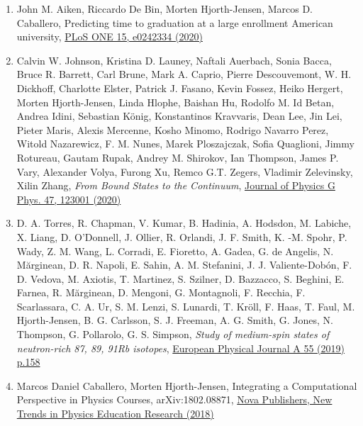 \documentclass[%
oneside,                 %
final,                   %
10pt]{article}
\begin{document}
\begin{enumerate}
\item John M. Aiken, Riccardo De Bin, Morten Hjorth-Jensen, Marcos D. Caballero, Predicting time to graduation at a large enrollment American university, \href{{https://doi.org/10.1371/journal.pone.0242334}}{PLoS ONE 15, e0242334 (2020)}

\item Calvin W. Johnson, Kristina D. Launey, Naftali Auerbach, Sonia Bacca, Bruce R. Barrett, Carl Brune, Mark A. Caprio, Pierre Descouvemont, W. H. Dickhoff, Charlotte Elster, Patrick J. Fasano, Kevin Fossez, Heiko Hergert, Morten Hjorth-Jensen, Linda Hlophe, Baishan Hu, Rodolfo M. Id Betan, Andrea Idini, Sebastian König, Konstantinos Kravvaris, Dean Lee, Jin Lei, Pieter Maris, Alexis Mercenne, Kosho Minomo, Rodrigo Navarro Perez, Witold Nazarewicz, F. M. Nunes, Marek Ploszajczak, Sofia Quaglioni, Jimmy Rotureau, Gautam Rupak, Andrey M. Shirokov, Ian Thompson, James P. Vary, Alexander Volya, Furong Xu, Remco G.T. Zegers, Vladimir Zelevinsky, Xilin Zhang, \emph{From Bound States to the Continuum}, \href{{https://urldefense.com/v3/__https://iopscience.iop.org/article/10.1088/1361-6471/abb129__;!!HXCxUKc!nOuho6Yd_SYxj9PUxWEODhuHbyyRAD_27R1bipWQvrj6Jjnwzdi7Z4FRJSF1-w$}}{Journal of Physics G Phys. 47, 123001  (2020)}

\item D. A. Torres, R. Chapman, V. Kumar, B. Hadinia, A. Hodsdon, M. Labiche, X. Liang, D. O’Donnell, J. Ollier, R. Orlandi, J. F. Smith, K. -M. Spohr, P. Wady, Z. M. Wang, L. Corradi, E. Fioretto, A. Gadea, G. de Angelis, N. Mărginean, D. R. Napoli, E. Sahin, A. M. Stefanini, J. J. Valiente-Dobón, F. D. Vedova, M. Axiotis, T. Martinez, S. Szilner, D. Bazzacco, S. Beghini, E. Farnea, R. Mărginean, D. Mengoni, G. Montagnoli, F. Recchia, F. Scarlassara, C. A. Ur, S. M. Lenzi, S. Lunardi, T. Kröll, F. Haas, T. Faul, M. Hjorth-Jensen, B. G. Carlsson, S. J. Freeman, A. G. Smith, G. Jones, N. Thompson, G. Pollarolo, G. S. Simpson, \emph{Study of medium-spin states of neutron-rich 87, 89, 91Rb isotopes}, \href{{https://epja.epj.org/articles/epja/abs/2019/09/10050_2019_Article_12839/10050_2019_Article_12839.html}}{European Physical Journal A 55 (2019) p.158}

\item Marcos Daniel Caballero, Morten Hjorth-Jensen, Integrating a Computational Perspective in Physics Courses, arXiv:1802.08871, \href{{https://novapublishers.com/shop/new-trends-in-physics-education-research/}}{Nova Publishers, New Trends in Physics Education Research (2018)}


\end{enumerate}
\end{document}

